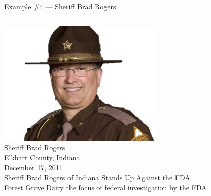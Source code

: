 \begin{frame}{Example \#4 --- Sheriff Brad Rogers}
    \begin{columns}[onlytextwidth]
            \centering
            \includegraphics[width=0.75\textwidth]{img/brad-rogers.png} \\
            Sheriff Brad Rogers \\
            Elkhart County, Indiana \\

            December 17, 2011 \\
            \vspace{10pt}
            { \Large Sheriff Brad Rogers of Indiana Stands Up Against the FDA  \\}
            \vspace{10pt}
            Forest Grove Dairy the focus of federal investigation by the FDA
    \end{columns}
\end{frame}

